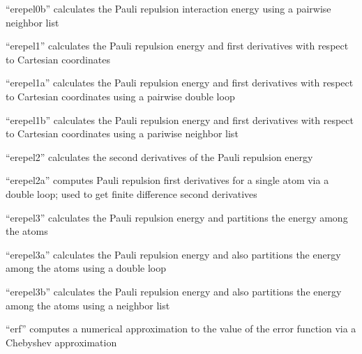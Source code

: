 \documentclass[letterpaper,11pt,english]{sphinxmanual}
\begin{document}
\sphinxAtStartPar
{}

\sphinxAtStartPar
“erepel0b” calculates the Pauli repulsion interaction energy using a pairwise neighbor list

\sphinxAtStartPar
{}

\sphinxAtStartPar
“erepel1” calculates the Pauli repulsion energy and first derivatives with respect to Cartesian coordinates

\sphinxAtStartPar
{}

\sphinxAtStartPar
“erepel1a” calculates the Pauli repulsion energy and first derivatives with respect to Cartesian coordinates using a pairwise double loop

\sphinxAtStartPar
{}

\sphinxAtStartPar
“erepel1b” calculates the Pauli repulsion energy and first derivatives with respect to Cartesian coordinates using a pariwise neighbor list

\sphinxAtStartPar
{}

\sphinxAtStartPar
“erepel2” calculates the second derivatives of the Pauli repulsion energy

\sphinxAtStartPar
{}

\sphinxAtStartPar
“erepel2a” computes Pauli repulsion first derivatives for a single atom via a double loop; used to get finite difference second derivatives

\sphinxAtStartPar
{}

\sphinxAtStartPar
“erepel3” calculates the Pauli repulsion energy and partitions the energy among the atoms

\sphinxAtStartPar
{}

\sphinxAtStartPar
“erepel3a” calculates the Pauli repulsion energy and also partitions the energy among the atoms using a double loop

\sphinxAtStartPar
{}

\sphinxAtStartPar
“erepel3b” calculates the Pauli repulsion energy and also partitions the energy among the atoms using a neighbor list

\sphinxAtStartPar
{}

\sphinxAtStartPar
“erf” computes a numerical approximation to the value of the error function via a Chebyshev approximation
\end{document}
